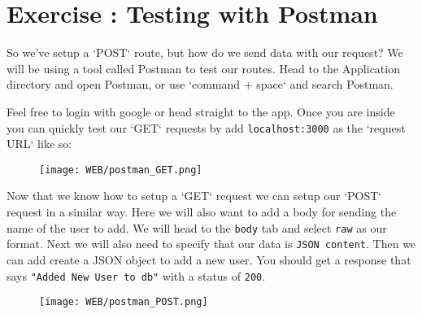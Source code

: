 \documentclass{42-en}
\begin{document}
\newpage
\nextexercice


\chapter{Exercise \exercicenumber: Testing with Postman}

    So we've setup a `POST` route, but how do we send data with our request? We will be using a tool called Postman to test our routes. Head to the Application directory and open Postman, or use  `command + space` and search Postman.

    Feel free to login with google or head straight to the app. Once you are inside you can quickly test our `GET` requests by add \texttt{localhost:3000} as the `request URL` like so:

    \begin{figure}[H]
        \begin{center}
            \texttt{[image: WEB/postman\_GET.png]}
        \end{center}
    \end{figure}

Now that we know how to setup a `GET` request we can setup our `POST` request in a similar way. Here we will also want to add a body for sending the name of the user to add. We will head to the \texttt{body} tab and select \texttt{raw} as our format. Next we will also need to specify that our data is \texttt{JSON content}. Then we can add create a JSON object to add a new user. You should get a response that says \texttt{"Added New User to db"} with a status of \texttt{200}.

    \begin{figure}[H]
        \begin{center}
            \texttt{[image: WEB/postman\_POST.png]}
        \end{center}
    \end{figure}

\end{document}
